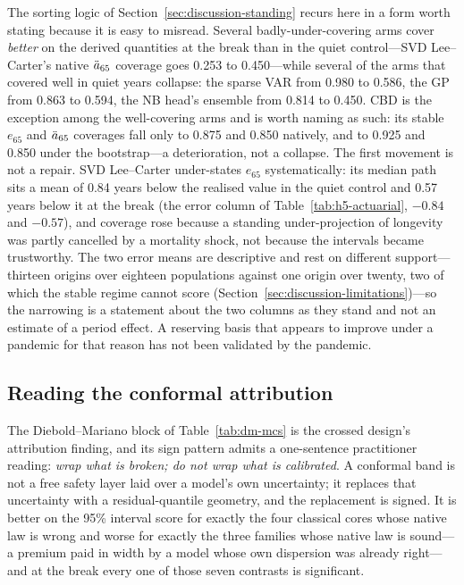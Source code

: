 The sorting logic of Section~\ref{sec:discussion-standing} recurs here in
a form worth stating because it is easy to misread. Several
badly-under-covering arms cover \emph{better} on the derived quantities
at the break than in the quiet control---SVD Lee--Carter's native
$\ddot{a}_{65}$ coverage goes 0.253 to 0.450---while several of the arms that
covered well in quiet years collapse: the sparse VAR from 0.980 to 0.586,
the GP from 0.863 to 0.594, the NB head's ensemble from 0.814 to 0.450.
CBD is the exception among the well-covering arms and is worth naming as
such: its stable $e_{65}$ and $\ddot{a}_{65}$ coverages fall only to 0.875 and
0.850 natively, and to 0.925 and 0.850 under the bootstrap---a
deterioration, not a collapse. The first movement is not a repair. SVD
Lee--Carter under-states $e_{65}$ systematically: its median path sits a
mean of 0.84 years below the
realised value in the quiet control and 0.57 years below it at the break
(the error column of Table~\ref{tab:h5-actuarial}, $-0.84$ and $-0.57$),
and coverage rose because a standing under-projection of longevity was
partly cancelled by a mortality shock, not because the intervals became
trustworthy. The two error means are descriptive and rest on different
support---thirteen origins over eighteen populations against one origin
over twenty, two of which the stable regime cannot score
(Section~\ref{sec:discussion-limitations})---so the narrowing is a
statement about the two columns as they stand and not an estimate of a
period effect. A reserving basis that appears to improve under a pandemic
for that reason has not been validated by the pandemic.

\subsection{Reading the conformal attribution}
\label{sec:discussion-conformal}

The Diebold--Mariano block of Table~\ref{tab:dm-mcs} is the crossed
design's attribution finding, and its sign pattern admits a one-sentence
practitioner reading: \emph{wrap what is broken; do not wrap what is
calibrated}. A conformal band is not a free safety layer laid over a
model's own uncertainty; it replaces that uncertainty with a
residual-quantile geometry, and the replacement is signed. It is better
on the 95\% interval score for exactly the four classical cores whose
native law is wrong and worse for exactly the three families whose native
law is sound---a premium paid in width by a model whose own dispersion
was already right---and at the break every one of those seven contrasts
is significant.

